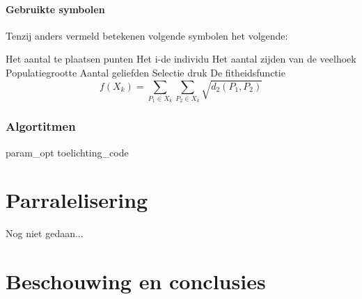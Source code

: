 \subsection{Gebruikte symbolen}
Tenzij anders vermeld betekenen volgende symbolen het volgende:
\begin{itemize}
 Het aantal te plaatsen punten
 Het i-de individu 
 Het aantal zijden van de veelhoek
 Populatiegrootte
 Aantal geliefden
 Selectie druk 
 De fitheidsfunctie \[f(X_k)= \sum_{P_1 \in X_k}\sum_{P_2 \in X_k} \sqrt{d_2(P_1,P_2)} \]
\end{itemize}



\section{Algortitmen}









 {param_opt}
 {toelichting_code}


\part{Parralelisering}
Nog niet gedaan...

\part{Beschouwing en conclusies}


